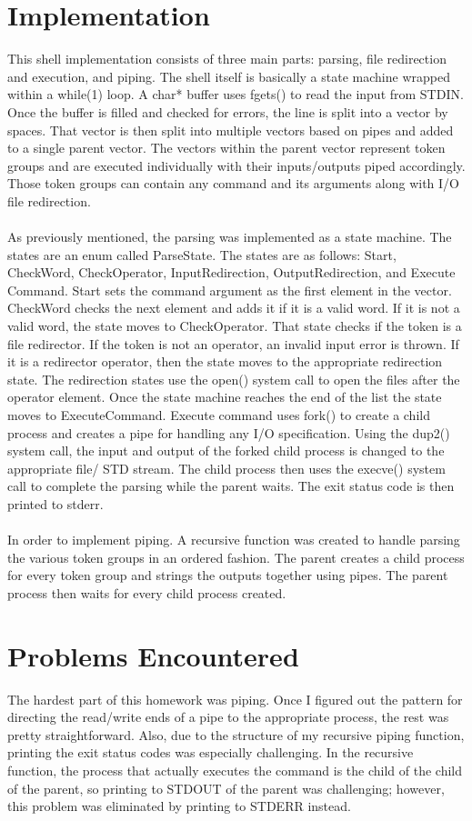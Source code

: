 \documentclass[12pt,letter,titlepage]{article}
\begin{document}
\section*{Implementation}
This shell implementation consists of three main parts: parsing, file redirection and execution, and piping. The shell itself is basically a state machine wrapped within a while(1) loop. A char* buffer uses fgets() to read the input from STDIN. Once the buffer is filled and checked for errors, the line is split into a vector by spaces. That vector is then split into multiple vectors based on pipes and added to a single parent vector. The vectors within the parent vector represent token groups and are executed individually with their inputs/outputs piped accordingly. Those token groups can contain any command and its arguments along with I/O file redirection. \\ \\
As previously mentioned, the parsing was implemented as a state machine. The states are an enum called ParseState. The states are as follows: Start, CheckWord, CheckOperator, InputRedirection, OutputRedirection, and Execute Command. Start sets the command argument as the first element in the vector. CheckWord checks the next element and adds it if it is a valid word. If it is not a valid word, the state moves to CheckOperator. That state checks if the token is a file redirector. If the token is not an operator, an invalid input error is thrown. If it is a redirector operator, then the state moves to the appropriate redirection state. The redirection states use the open() system call to open the files after the operator element. Once the state machine reaches the end of the list the state moves to ExecuteCommand. Execute command uses fork() to create a child process and creates a pipe for handling any I/O specification. Using the dup2() system call, the input and output of the forked child process is changed to the appropriate file/ STD stream. The child process then uses the execve() system call to complete the parsing while the parent waits. The exit status code is then printed to stderr. \\ \\
In order to implement piping. A recursive function was created to handle parsing the various token groups in an ordered fashion. The parent creates a child process for every token group and strings the outputs together using pipes. The parent process then waits for every child process created.

\section*{Problems Encountered}
The hardest part of this homework was piping. Once I figured out the pattern for directing the read/write ends of a pipe to the appropriate process, the rest was pretty straightforward. Also, due to the structure of my recursive piping function, printing the exit status codes was especially challenging. In the recursive function, the process that actually executes the command is the child of the child of the parent, so printing to STDOUT of the parent was challenging; however, this problem was eliminated by printing to STDERR instead.
\end{document}
